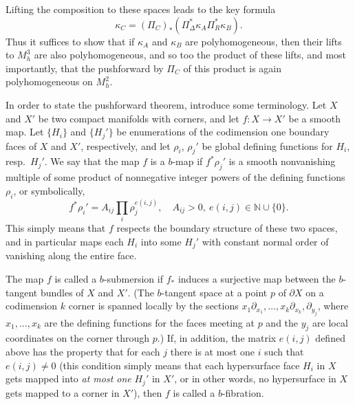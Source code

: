 Lifting the composition to these spaces leads to the key formula
\begin{equation}
\kappa_C = (\Pi_C)_* \left( \Pi_\Delta^* \kappa_A  \Pi_R^* \kappa_B \right).
\label{comp2}
\end{equation}
Thus it suffices to show that if $\kappa_A$ and $\kappa_B$ are polyhomogeneous, then their lifts to $M^3_h$
are also polyhomogeneous, and so too the product of these lifts, and most importantly, that the pushforward
by $\Pi_C$ of this product is again polyhomogeneous on $M^2_h$.  


In order to state the pushforward theorem, introduce some terminology.  
Let $X$ and $X'$ be two compact manifolds with corners, and let $f: X \to X'$ 
be a smooth map.  Let $\{H_i\}$ and $\{H_j'\}$ be enumerations of the codimension one boundary faces of $X$ and $X'$,
respectively, and let $\rho_i$, $\rho_j'$ be global defining functions for $H_i$, resp.\ $H_j'$. We say that the map $f$
is a $b$-map if $f^* \rho_j'$ is a smooth nonvanishing multiple of some product of nonnegative integer powers
of the defining functions $\rho_i$, or symbolically,
\[
f^* \rho_i' = A_{ij} \prod_i \rho_j^{e(i,j)}, \quad A_{ij} > 0,\ e(i,j) \in \mathbb{N} \cup \{0\}.
\]
This simply means that $f$ respects the boundary structure of these two spaces, and in particular maps each $H_i$ into some $H_j'$ 
with constant normal order of vanishing along the entire face. 

The map $f$ is called a $b$-submersion if $f_*$ induces a surjective map between the $b$-tangent bundles
of $X$ and $X'$. (The $b$-tangent space at a point $p$ of $\partial X$ on a codimension  $k$ corner is spanned locally by  the
sections $x_1 \partial_{x_1}, \ldots, x_k \partial_{x_k}, \partial_{y_j}$, where $x_1, \ldots, x_k$ are the defining functions for the faces
meeting at $p$ and the $y_j$ are local coordinates on the corner through $p$.)  If, in addition, the matrix $e(i,j)$ defined
above has the property that for each $j$ there is at most one $i$ such that $e(i,j) \neq 0$ (this condition simply means
that each hypersurface face $H_i$ in $X$ gets mapped into \emph{at most one} $H_j'$ in $X'$, or in other words, no
hypersurface in $X$ gets mapped to a corner in $X'$), then $f$ is called a $b$-fibration. 

